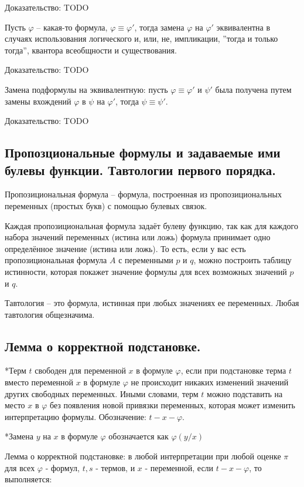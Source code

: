 \documentclass[a4paper, 10pt]{article}
\begin{document}
Доказательство: TODO

Пусть $\varphi$ -- какая-то формула, $\varphi\equiv\varphi'$, тогда замена $\varphi$ на $\varphi'$ эквивалентна в случаях использования логического и, или, не, импликации, ''тогда и только тогда'', квантора всеобщности и существования.

Доказательство: TODO

Замена подформулы на эквивалентную: пусть $\varphi\equiv\varphi'$ и $\psi'$ была получена путем замены вхождений $\varphi$ в $\psi$ на $\varphi'$, тогда $\psi\equiv\psi'$.

Доказательство: TODO

\subsection{Пропозциональные формулы и задаваемые ими булевы функции. Тавтологии первого порядка.}

Пропозициональная формула -- формула, построенная из пропозициональных переменных (простых букв) с помощью булевых связок.

Каждая пропозициональная формула задаёт булеву функцию, так как для каждого набора значений переменных (истина или ложь) формула принимает одно определённое значение (истина или ложь). То есть, если у вас есть пропозициональная формула $A$ с переменными $p$ и $q$, можно построить таблицу истинности, которая покажет значение формулы для всех возможных значений $p$ и $q$.

Тавтология -- это формула, истинная при любых значениях ее переменных. Любая тавтология общезначима.

\subsection{Лемма о корректной подстановке.}

*Терм $t$ свободен для переменной $x$ в формуле $\varphi$, если при подстановке терма $t$ вместо переменной $x$ в формуле $\varphi$ не происходит никаких изменений значений других свободных переменных. Иными словами, терм $t$ можно подставить на место $x$ в $\varphi$ без появления новой привязки переменных, которая может изменить интерпретацию формулы. Обозначение: $t-x-\varphi$.

*Замена $y$ на $x$ в формуле $\varphi$ обозначается как $\varphi(y/x)$

Лемма о корректной подстановке: в любой интерпретации при любой оценке $\pi$ для всех $\varphi$ - формул, $t,s$ - термов, и $x$ - переменной, если $t-x-\varphi$, то выполняется:
\end{document}
